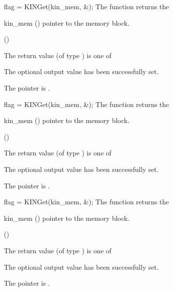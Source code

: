 {}
{
  flag = KINGet(kin\_mem, \&);
}
{
  The function  returns the
}
{
  \begin{args}
  \item[kin\_mem] ()
    pointer to the {\kinsol} memory block.
  \item[] (\id{})

  \end{args}
}
{
  The return value  (of type ) is one of
  \begin{args}
  \item[\Id{KIN\_SUCCESS}] 
    The optional output value has been successfully set.
  \item[\Id{KIN\_MEM\_NULL}]
    The  pointer is .
  \end{args}
}
{}
{
  flag = KINGet(kin\_mem, \&);
}
{
  The function  returns the
}
{
  \begin{args}
  \item[kin\_mem] ()
    pointer to the {\kinsol} memory block.
  \item[] (\id{})

  \end{args}
}
{
  The return value  (of type ) is one of
  \begin{args}
  \item[\Id{KIN\_SUCCESS}] 
    The optional output value has been successfully set.
  \item[\Id{KIN\_MEM\_NULL}]
    The  pointer is .
  \end{args}
}
{}
{
  flag = KINGet(kin\_mem, \&);
}
{
  The function  returns the
}
{
  \begin{args}
  \item[kin\_mem] ()
    pointer to the {\kinsol} memory block.
  \item[] (\id{})

  \end{args}
}
{
  The return value  (of type ) is one of
  \begin{args}
  \item[\Id{KIN\_SUCCESS}] 
    The optional output value has been successfully set.
  \item[\Id{KIN\_MEM\_NULL}]
    The  pointer is .
  \end{args}
}

